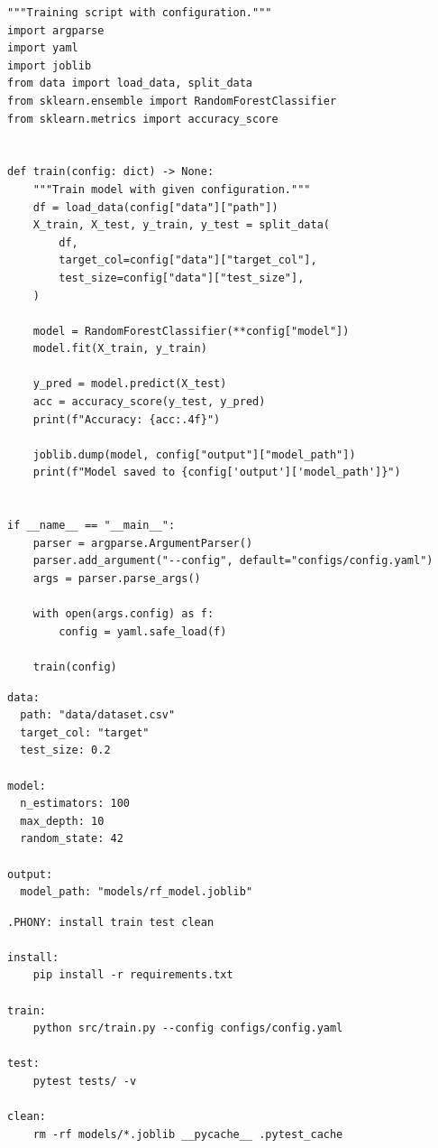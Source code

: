 \begin{codeblock}[title=\textbf{src/train.py --- Training script}]
\begin{verbatim}
"""Training script with configuration."""
import argparse
import yaml
import joblib
from data import load_data, split_data
from sklearn.ensemble import RandomForestClassifier
from sklearn.metrics import accuracy_score


def train(config: dict) -> None:
    """Train model with given configuration."""
    df = load_data(config["data"]["path"])
    X_train, X_test, y_train, y_test = split_data(
        df,
        target_col=config["data"]["target_col"],
        test_size=config["data"]["test_size"],
    )

    model = RandomForestClassifier(**config["model"])
    model.fit(X_train, y_train)

    y_pred = model.predict(X_test)
    acc = accuracy_score(y_test, y_pred)
    print(f"Accuracy: {acc:.4f}")

    joblib.dump(model, config["output"]["model_path"])
    print(f"Model saved to {config['output']['model_path']}")


if __name__ == "__main__":
    parser = argparse.ArgumentParser()
    parser.add_argument("--config", default="configs/config.yaml")
    args = parser.parse_args()

    with open(args.config) as f:
        config = yaml.safe_load(f)

    train(config)
\end{verbatim}
\end{codeblock}

\begin{codeblock}[title=\textbf{configs/config.yaml}]
\begin{verbatim}
data:
  path: "data/dataset.csv"
  target_col: "target"
  test_size: 0.2

model:
  n_estimators: 100
  max_depth: 10
  random_state: 42

output:
  model_path: "models/rf_model.joblib"
\end{verbatim}
\end{codeblock}

\begin{codeblock}[title=\textbf{Makefile}]
\begin{verbatim}
.PHONY: install train test clean

install:
	pip install -r requirements.txt

train:
	python src/train.py --config configs/config.yaml

test:
	pytest tests/ -v

clean:
	rm -rf models/*.joblib __pycache__ .pytest_cache
\end{verbatim}
\end{codeblock}

